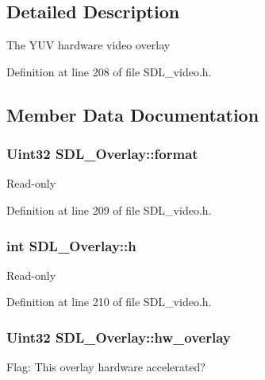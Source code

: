 \subsection{Detailed Description}
The Y\+U\+V hardware video overlay 

Definition at line 208 of file S\+D\+L\+\_\+video.\+h.



\subsection{Member Data Documentation}
\hypertarget{structSDL__Overlay_a421f873d1ffc5530c1f9d4b49be75d4e}{
\subsubsection[{format}]{\setlength{\rightskip}{0pt plus 5cm}Uint32 S\+D\+L\+\_\+\+Overlay\+::format}}\label{structSDL__Overlay_a421f873d1ffc5530c1f9d4b49be75d4e}
Read-\/only 

Definition at line 209 of file S\+D\+L\+\_\+video.\+h.

\hypertarget{structSDL__Overlay_af1402a7a7cd8ba2816ddc7542c9d3e67}{
\subsubsection[{h}]{\setlength{\rightskip}{0pt plus 5cm}int S\+D\+L\+\_\+\+Overlay\+::h}}\label{structSDL__Overlay_af1402a7a7cd8ba2816ddc7542c9d3e67}
Read-\/only 

Definition at line 210 of file S\+D\+L\+\_\+video.\+h.

\hypertarget{structSDL__Overlay_a3c24f3b1805074deb9ce6ef5b14f70dc}{
\subsubsection[{hw\+\_\+overlay}]{\setlength{\rightskip}{0pt plus 5cm}Uint32 S\+D\+L\+\_\+\+Overlay\+::hw\+\_\+overlay}}\label{structSDL__Overlay_a3c24f3b1805074deb9ce6ef5b14f70dc}
Flag\+: This overlay hardware accelerated? 

